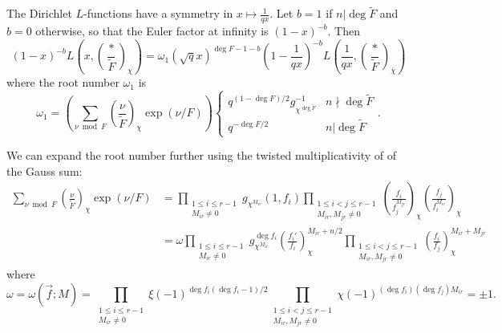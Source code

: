 \documentclass[11pt,letterpaper]{article}
\theoremstyle{definition}
\theoremstyle{remark}
\numberwithin{equation}{section}
\theoremstyle{dotless}
\newcommand{\res}[2]{\left(\frac{#1}{#2}\right)}
\renewcommand{\tilde}{\widetilde}
\begin{document}
The Dirichlet $L$-functions have a symmetry in $x \mapsto \frac{1}{qx}$. Let $b=1$ if $n|\deg \tilde{F}$ and $b=0$ otherwise, so that the Euler factor at infinity is $(1-x)^{-b}$. Then 
\begin{equation}
(1-x)^{-b} L\left(x, \res{*}{\tilde{F}}_{\chi} \right)=\omega_1 (\sqrt{q}x)^{\deg F -1-b} \left(1-\frac{1}{qx}\right)^{-b}L\left(\frac{1}{qx}, \res{*}{\tilde{F}}_{\bar{\chi}}\right)
\end{equation}
where the root number $\omega_1$ is 
\begin{equation*}
\omega_1= \left( \sum_{\nu \bmod F} \res{\nu}{\tilde{F}}_{\chi} \exp \left(\nu/F \right) \right) \left\lbrace \begin{array}{cc} q^{(1- \deg F)/2}g_{\chi^{\deg \tilde{F}}}^{-1} & n \nmid \deg \tilde{F} \\ q^{- \deg F/2} & n | \deg \tilde{F} \end{array} \right. .
\end{equation*}

We can expand the root number further using the twisted multiplicativity of of the Gauss sum:
\begin{equation*}
\begin{split}
\sum_{\nu \bmod F} \res{\nu}{\tilde{F}}_{\chi} \exp \left(\nu/F\right) &= \prod_{\substack{1 \leq i \leq r-1 \\ M_{ir} \neq 0}} g_{\chi^{M_{ir}}}(1, f_i) \prod_{\substack{1 \leq i<j \leq r-1 \\ M_{ir}, M_{jr} \neq 0}} \res{f_i}{f_j^{M_{jr}}}_\chi \res{f_j}{f_i^{M_{ir}}}_\chi \\
&=\omega  \prod_{\substack{1 \leq i \leq r-1 \\ M_{ir} \neq 0}} g_{\chi^{M_{ir}}}^{\deg f_i} \res{f_i'}{f_i}_\chi^{M_{ir}+n/2} \prod_{\substack{1 \leq i<j \leq r-1 \\ M_{ir}, M_{jr} \neq 0}} \res{f_i}{f_j}_{\chi}^{M_{ir}+M_{jr}} 
\end{split}
\end{equation*}
where 
\begin{equation} \label{RootNumberSign}
\omega =\omega(\vec{f}; M)= \prod_{\substack{1 \leq i \leq r-1 \\ M_{ir} \neq 0}} \xi(-1)^{\deg f_i(\deg f_i-1)/2} \prod_{\substack{1 \leq i<j \leq r-1 \\ M_{ir}, M_{jr} \neq 0}} \chi(-1)^{(\deg f_i)(\deg f_j) M_{ir} } = \pm 1.
\end{equation}
\end{document}
